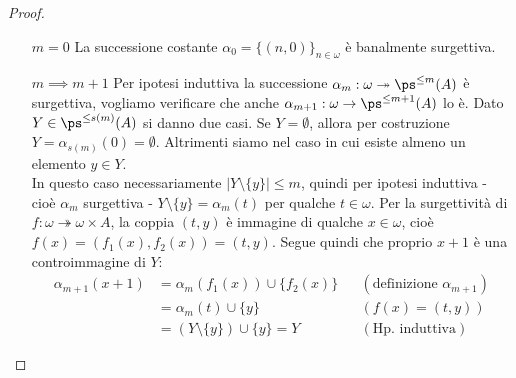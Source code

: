 \begin{proof}
	\begin{itemize}
		\item[$\boxed{m = 0}$] La successione costante $\alpha_0 = \{(n,0)\}_{n \in \omega}$ è banalmente surgettiva.
		\item[$\boxed{m \implies m + 1}$] Per ipotesi induttiva la successione $\alpha_m : \omega \twoheadrightarrow \ps^{\leq m}(A)$ è surgettiva, vogliamo verificare che anche $\alpha_{m + 1} : \omega \to \ps^{\leq m + 1}(A)$ lo è.
		Dato $Y \in \ps^{\leq s(m)}(A)$ si danno due casi. Se $Y = \emptyset$, allora per costruzione $Y = \alpha_{s(m)}(0) = \emptyset$. Altrimenti siamo nel caso in cui esiste almeno un elemento $y \in Y$.\\
		In questo caso necessariamente $|Y\setminus\{y\}| \leq m$, quindi per ipotesi induttiva - cioè $\alpha_m$ surgettiva - $Y \setminus\{y\} = \alpha_m(t)$ per qualche $t \in \omega$.
		Per la surgettività di $f : \omega \twoheadrightarrow \omega \times A$, la coppia $(t,y)$ è immagine di qualche $x \in \omega$, cioè $f(x) = (f_1(x),f_2(x)) = (t,y)$.
		Segue quindi che proprio $x+1$ è una controimmagine di $Y$:
		\begin{align*}
			\alpha_{m + 1}(x+1) &= \alpha_m(f_1(x)) \cup \{f_2(x)\} &&(\text{definizione $\alpha_{m+1}$})\\
							   &= \alpha_m(t) \cup \{y\} &&(f(x) = (t,y)) \\
							   &= (Y \setminus\{y\}) \cup \{y\} = Y &&(\text{Hp. induttiva})
		\end{align*}
	\end{itemize}
\end{proof}

